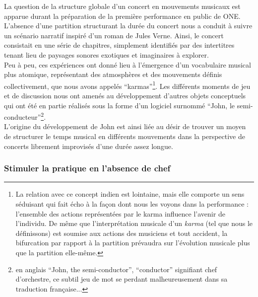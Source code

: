 \noindent La question de la structure globale d'un concert en mouvements musicaux est apparue durant la préparation de la première performance en public de ONE. L'absence d'une partition structurant la durée du concert nous a conduit à suivre un scénario narratif inspiré d'un roman de Jules Verne. Ainsi, le concert consistait en une série de chapitres, simplement identifiés par des intertitres tenant lieu de paysages sonores exotiques et imaginaires à explorer.\\
\indent Peu à peu, ces expériences ont donné lieu à l'émergence d'un vocabulaire musical plus atomique, représentant des atmosphères et des mouvements définis collectivement, que nous avons appelés ``karmas''\footnote{La relation avec ce concept indien est lointaine, mais elle comporte un sens séduisant qui fait écho à la façon dont nous les voyons dans la performance : l'ensemble des actions représentées par le karma influence l'avenir de l'individu. De même que l'interprétation musicale d'un \textit{karma} (tel que nous le définissons) est soumise aux actions des musiciens et tout accident, la bifurcation par rapport à la partition prévaudra sur l'évolution musicale plus que la partition elle-même.}. Les différents moments de jeu et de discussion nous ont amenés au développement d'autres objets conceptuels qui ont été en partie réalisés sous la forme d'un logiciel surnommé ``John, le semi-conducteur''\footnote{en anglais ``John, the semi-conductor'', ``conductor'' signifiant chef d'orchestre, ce subtil jeu de mot se perdant malheureusement dans sa traduction française...}.\\
\indent L'origine du développement de John est ainsi liée au désir de trouver un moyen de structurer le temps musical en différents mouvements dans la perspective de concerts librement improvisés d'une durée assez longue. 

\subsubsection{Stimuler la pratique en l'absence de chef}

